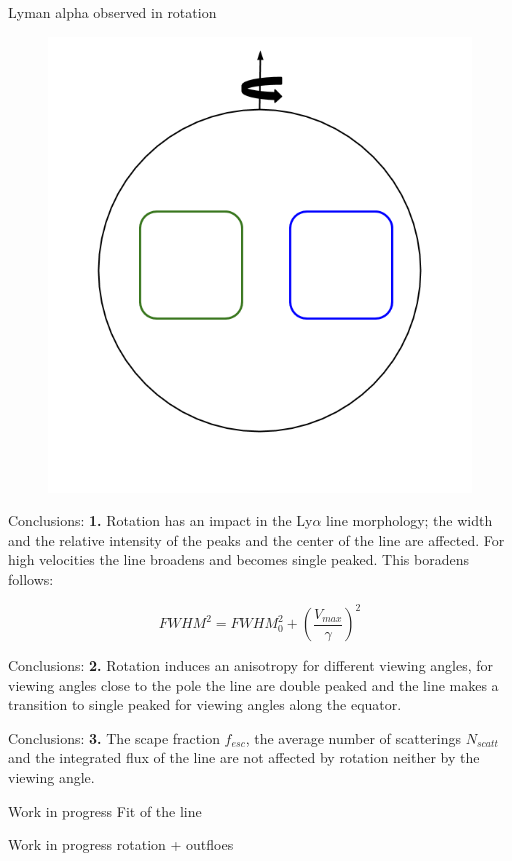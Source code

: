 \documentclass{beamer}
\begin{document}
\begin{frame}{Lyman alpha observed in rotation}
\begin{figure}
\includegraphics[scale=0.2]{Figures/measure.png}
\end{figure}
\end{frame}

\begin{frame}{Conclusions:}
\textbf{1.} Rotation has an impact in the Ly$\alpha$ line morphology; the width and the relative intensity 
of the peaks and the center of the line are affected.  For high velocities the line broadens and
becomes single peaked. This boradens follows:

\[
FWHM^2 = FWHM_0^2 + \left( \dfrac{V_{max}}{\gamma} \right )^2
\]
\end{frame}

\begin{frame}{Conclusions:}
\textbf{2.} Rotation induces an anisotropy for different viewing angles, for viewing angles close to the 
pole the line are double peaked and the line makes a transition to single peaked for viewing 
angles along the equator.
\end{frame}


\begin{frame}{Conclusions:}
\textbf{3.} The scape fraction $f_{esc}$, the average number of scatterings $N_{scatt}$ 
and the integrated flux of the line are not affected by rotation neither by the viewing angle.
\end{frame}

\begin{frame}{Work in progress}
Fit of the line
\end{frame}

\begin{frame}{Work in progress}
rotation + outfloes
\end{frame}
\end{document}
